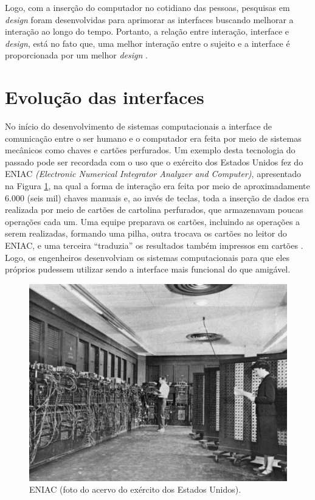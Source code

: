 Logo, com a inserção do computador no cotidiano das pessoas, pesquisas em \textit{design} foram desenvolvidas para aprimorar as interfaces buscando melhorar a interação ao longo do tempo. Portanto, a relação entre interação, interface e \textit{design}, está no fato que, uma melhor interação entre o sujeito e a interface é proporcionada por um melhor \textit{design} \cite{lemos2015cibercultura}.

\section{Evolução das interfaces} \label{section:evolucao-das-interfaces}
No início do desenvolvimento de sistemas computacionais a interface de comunicação entre o ser humano e o computador era feita por meio de sistemas mecânicos como chaves e cartões perfurados. Um exemplo desta tecnologia do passado pode ser recordada com o uso que o exército dos Estados Unidos fez do ENIAC \textit{(Electronic Numerical Integrator Analyzer and Computer)}, apresentado na Figura \ref{fig:eniac}, na qual a forma de interação era feita por meio de aproximadamente 6.000 (seis mil) chaves manuais e, ao invés de teclas, toda a inserção de dados era realizada por meio de cartões de cartolina perfurados, que armazenavam poucas operações cada um. Uma equipe preparava os cartões, incluindo as operações a serem realizadas, formando uma pilha, outra trocava os cartões no leitor do ENIAC, e uma terceira ``traduzia'' os resultados também impressos em cartões \cite{Morimoto2011}. Logo, os engenheiros desenvolviam os sistemas computacionais para que eles próprios pudessem utilizar sendo a interface mais funcional do que amigável.

\begin{figure}[H]
    \centering
    \includegraphics[scale=0.6]{imagens/eniac.jpg}
    \caption{ENIAC (foto do acervo do exército dos Estados Unidos).}
    \label{fig:eniac}
\end{figure}

